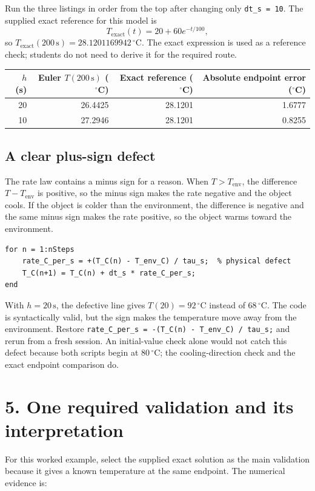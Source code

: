 \documentclass[11pt,a4paper]{article}
\newcommand{\units}[1]{\,\mathrm{#1}}
\begin{document}
Run the three listings in order from the top after changing only \texttt{dt\_s = 10}. The supplied exact reference for this model is
\[
T_{\mathrm{exact}}(t)=20+60e^{-t/100},
\]
so $T_{\mathrm{exact}}(200\units{s})=28.1201169942\units{^\circ C}$. The exact expression is used as a reference check; students do not need to derive it for the required route.

\begin{center}\small
\begin{tabular}{rrrr}
\toprule
\textbf{$h$ (s)} & \textbf{Euler $T(200\units{s})$ ($^\circ$C)} & \textbf{Exact reference ($^\circ$C)} & \textbf{Absolute endpoint error ($^\circ$C)} \\
\midrule
20 & 26.4425 & 28.1201 & 1.6777 \\
10 & 27.2946 & 28.1201 & 0.8255 \\
\bottomrule
\end{tabular}
\end{center}

\subsection*{A clear plus-sign defect}
The rate law contains a minus sign for a reason. When $T>T_{\mathrm{env}}$, the difference $T-T_{\mathrm{env}}$ is positive, so the minus sign makes the rate negative and the object cools. If the object is colder than the environment, the difference is negative and the same minus sign makes the rate positive, so the object warms toward the environment.

\begin{lstlisting}[style=matlabstyle,caption={MATLAB defect example: a sign reversal in the Euler cooling rate}]
for n = 1:nSteps
    rate_C_per_s = +(T_C(n) - T_env_C) / tau_s;  % physical defect
    T_C(n+1) = T_C(n) + dt_s * rate_C_per_s;
end
\end{lstlisting}

With $h=20\units{s}$, the defective line gives $T(20)=92\units{^\circ C}$ instead of $68\units{^\circ C}$. The code is syntactically valid, but the sign makes the temperature move away from the environment. Restore
\texttt{rate\_C\_per\_s = -(T\_C(n) - T\_env\_C) / tau\_s;} and rerun from a fresh session. An initial-value check alone would not catch this defect because both scripts begin at $80\units{^\circ C}$; the cooling-direction check and the exact endpoint comparison do.

\section*{5. One required validation and its interpretation}
For this worked example, select the supplied exact solution as the main validation because it gives a known temperature at the same endpoint. The numerical evidence is:
\end{document}
